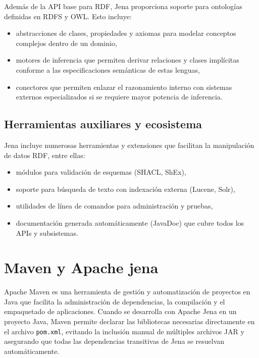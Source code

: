 \documentclass{article}
\begin{document}
Además de la API base para RDF, Jena proporciona soporte para ontologías definidas en RDFS y OWL. Esto incluye:

\begin{itemize}
    \item abstracciones de clases, propiedades y axiomas para modelar conceptos complejos dentro de un dominio,
    \item motores de inferencia que permiten derivar relaciones y clases implícitas conforme a las especificaciones semánticas de estas lenguas,
    \item conectores que permiten enlazar el razonamiento interno con sistemas externos especializados si se requiere mayor potencia de inferencia. 
\end{itemize}

\subsection{Herramientas auxiliares y ecosistema}

Jena incluye numerosas herramientas y extensiones que facilitan la manipulación de datos RDF, entre ellas:

\begin{itemize}
    \item módulos para validación de esquemas (SHACL, ShEx),
    \item soporte para búsqueda de texto con indexación externa (Lucene, Solr),
    \item utilidades de línea de comandos para administración y pruebas,
    \item documentación generada automáticamente (JavaDoc) que cubre todos los APIs y subsistemas. 
\end{itemize}


\section{Maven y Apache jena}

Apache Maven es una herramienta de gestión y automatización de proyectos en Java que facilita la administración de dependencias, la compilación y el empaquetado de aplicaciones. Cuando se desarrolla con Apache Jena en un proyecto Java, Maven permite declarar las bibliotecas necesarias directamente en el archivo \texttt{pom.xml}, evitando la inclusión manual de múltiples archivos JAR y asegurando que todas las dependencias transitivas de Jena se resuelvan automáticamente.
\end{document}
